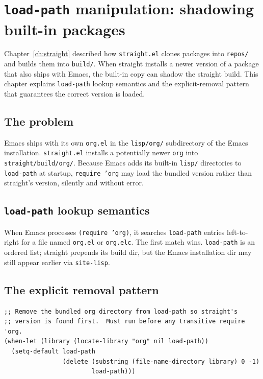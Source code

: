 \chapter{\texttt{load-path} manipulation: shadowing built-in packages}
\label{ch:load-path}
\minitoc\label{load-path-manipulation-shadowing-built-in-packages}

Chapter~\ref{ch:straight} described how \texttt{straight.el} clones
packages into \texttt{repos/} and builds them into \texttt{build/}.
When straight installs a newer version of a package that
also ships with Emacs, the built-in copy can shadow the straight
build.  This chapter explains \texttt{load-path} lookup semantics
and the explicit-removal pattern that guarantees the correct version
is loaded.

\section{The problem}\label{the-problem-1}

Emacs ships with its own \texttt{org.el} in the \texttt{lisp/org/} subdirectory of the Emacs installation. \texttt{straight.el} installs a potentially newer \texttt{org} into \texttt{straight/build/org/}. Because Emacs adds its built-in \texttt{lisp/} directories to \texttt{load-path} at startup, \texttt{require 'org} may load the bundled version rather than straight's version, silently and without error.

\section{\texttt{load-path} lookup semantics}\label{load-path-lookup-semantics}

When Emacs processes \texttt{(require 'org)}, it searches \texttt{load-path} entries left-to-right for a file named \texttt{org.el} or \texttt{org.elc}. The first match wins. \texttt{load-path} is an ordered list; straight prepends its build dir, but the Emacs installation dir may still appear earlier via \texttt{site-lisp}.

\section{The explicit removal pattern}\label{the-explicit-removal-pattern}

\begin{verbatim}
;; Remove the bundled org directory from load-path so straight's
;; version is found first.  Must run before any transitive require 'org.
(when-let (library (locate-library "org" nil load-path))
  (setq-default load-path
                (delete (substring (file-name-directory library) 0 -1)
                        load-path)))
\end{verbatim}

